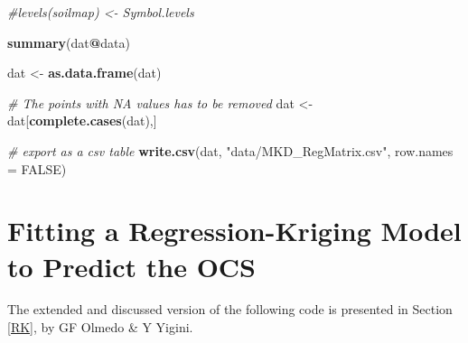 \documentclass[10pt,b5paper,]{book}
\newenvironment{Shaded}{\begin{snugshade}}{\end{snugshade}}
\newcommand{\CommentTok}[1]{\textcolor[rgb]{0.56,0.35,0.01}{\textit{#1}}}
\newcommand{\DataTypeTok}[1]{\textcolor[rgb]{0.13,0.29,0.53}{#1}}
\newcommand{\KeywordTok}[1]{\textcolor[rgb]{0.13,0.29,0.53}{\textbf{#1}}}
\newcommand{\NormalTok}[1]{#1}
\newcommand{\OperatorTok}[1]{\textcolor[rgb]{0.81,0.36,0.00}{\textbf{#1}}}
\newcommand{\OtherTok}[1]{\textcolor[rgb]{0.56,0.35,0.01}{#1}}
\newcommand{\StringTok}[1]{\textcolor[rgb]{0.31,0.60,0.02}{#1}}
\theoremstyle{definition}
\theoremstyle{definition}
\theoremstyle{definition}
\theoremstyle{remark}
\begin{document}
\begin{Shaded}
\begin{Highlighting}[]
\CommentTok{#levels(soilmap) <- Symbol.levels}

\KeywordTok{summary}\NormalTok{(dat}\OperatorTok{@}\NormalTok{data)}

\NormalTok{dat <-}\StringTok{ }\KeywordTok{as.data.frame}\NormalTok{(dat)}

\CommentTok{# The points with NA values has to be removed}
\NormalTok{dat <-}\StringTok{ }\NormalTok{dat[}\KeywordTok{complete.cases}\NormalTok{(dat),]}

\CommentTok{# export as a csv table}
\KeywordTok{write.csv}\NormalTok{(dat, }\StringTok{"data/MKD_RegMatrix.csv"}\NormalTok{, }\DataTypeTok{row.names =} \OtherTok{FALSE}\NormalTok{)}
\end{Highlighting}
\end{Shaded}

\clearpage

\hypertarget{cd:RK}{%
\section{Fitting a Regression-Kriging Model to Predict the
OCS}\label{cd:RK}}

The extended and discussed version of the following code is presented in
Section \ref{RK}, by GF Olmedo \& Y Yigini.
\end{document}
